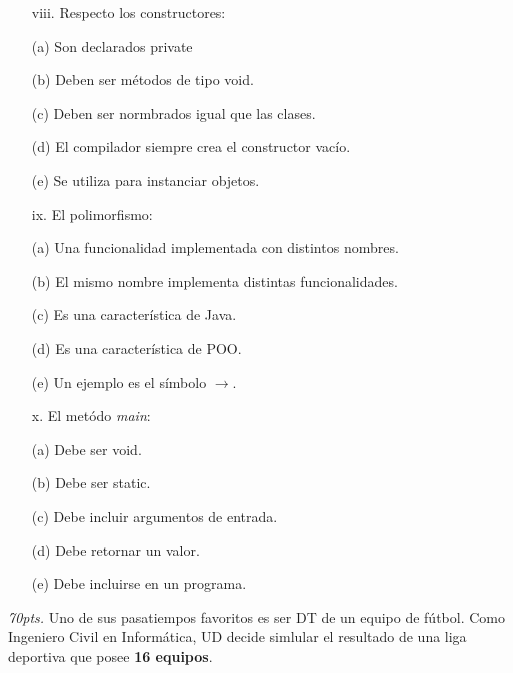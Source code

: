 \documentclass[10pt]{article}
\begin{document}
\begin{enumerate}
{\begin{multicols}{2}
    \begin{enumerate}[label=(\alph*)]
        \item[viii.] Respecto los constructores:
        \item[(a)] Son declarados private
        \item[(b)] Deben ser m\'etodos de tipo void.
        \item[(c)] Deben ser normbrados igual que las clases.
        \item[(d)] El compilador siempre crea el constructor vac\'io.
        \item[(e)] Se utiliza para instanciar objetos.
    \end{enumerate}

    \begin{enumerate}[label=(\alph*)]
        \item[ix.] El polimorfismo: 
        \item[(a)] Una funcionalidad implementada con distintos nombres.
        \item[(b)] El mismo nombre implementa distintas funcionalidades.
        \item[(c)] Es una caracter\'istica de Java.
        \item[(d)] Es una caracter\'istica de POO.
        \item[(e)] Un ejemplo es el s\'imbolo $\rightarrow$.
    \end{enumerate}

    \begin{enumerate}[label=(\alph*)]
        \item[x.] El met\'odo \emph{main}:
        \item[(a)] Debe ser void.
        \item[(b)] Debe ser static.
        \item[(c)] Debe incluir argumentos de entrada.
        \item[(d)] Debe retornar un valor.
        \item[(e)] Debe incluirse en un programa.
    \end{enumerate}

\end{multicols}

\newpage

\item \emph{70pts.} Uno de sus pasatiempos favoritos es ser DT de un equipo de f\'utbol. Como Ingeniero Civil en Inform\'atica, UD decide simlular el resultado de una liga deportiva que posee \textbf{16 equipos}.

}
\end{enumerate}
\end{document}
